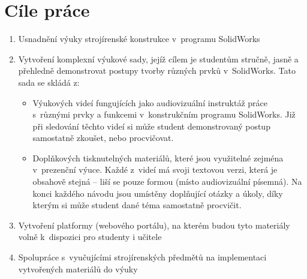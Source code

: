 \chapter{Cíle práce}

\begin{enumerate}[topsep=0pt]
    \setlength\itemsep{0em}
    \item Usnadnění výuky strojírenské konstrukce v~programu SolidWorks
    \item Vytvoření komplexní výukové sady, jejíž cílem je studentům stručně, jasně a přehledně demonstrovat postupy tvorby různých prvků v~SolidWorks. Tato sada se skládá z:
    \begin{itemize}[topsep=0pt]
        \setlength\itemsep{0em}
        \item Výukových videí fungujících jako audiovizuální instruktáž práce s~různými prvky a funkcemi v~konstrukčním programu SolidWorks. Již při sledování těchto videí si může student demonstrovaný postup samostatně zkoušet, nebo procvičovat. 
        \item Doplňkových tisknutelných materiálů, které jsou využitelné zejména v~prezenční výuce. Každé z~videí má svoji textovou verzi, která je obsahově stejná -- liší se pouze formou (místo audiovizuální písemná). Na konci každého návodu jsou umístěny doplňující otázky a úkoly, díky kterým si může student dané téma samostatně procvičit.
    \end{itemize}
    \item Vytvoření platformy (webového portálu), na kterém budou tyto materiály volně k~dispozici pro studenty i učitele
    \item Spolupráce s~vyučujícími strojírenských předmětů na implementaci vytvořených materiálů do výuky
\end{enumerate}
